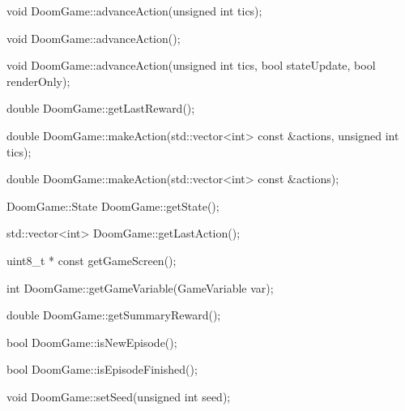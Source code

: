 \documentclass[english,bachelor,a4paper,twoside]{ppfcmthesis}
\begin{document}
\begin{clinee}
	void DoomGame::advanceAction(unsigned int tics);
\end{clinee}


\begin{clinee}
	void DoomGame::advanceAction();
\end{clinee}


\begin{clinee}
	void DoomGame::advanceAction(unsigned int tics, bool stateUpdate, bool renderOnly);
\end{clinee}


\begin{clinee}
	double DoomGame::getLastReward();
\end{clinee}


\begin{clinee}
	double DoomGame::makeAction(std::vector<int> const &actions, unsigned int tics);
\end{clinee}

   
\begin{clinee}
	double DoomGame::makeAction(std::vector<int> const &actions);
\end{clinee}


\begin{clinee}
	DoomGame::State DoomGame::getState();
\end{clinee}


\begin{clinee}
	std::vector<int> DoomGame::getLastAction();
\end{clinee}


\begin{clinee}
	uint8_t * const getGameScreen();
\end{clinee}


\begin{clinee}
	int DoomGame::getGameVariable(GameVariable var);
\end{clinee}


\begin{clinee}
	double DoomGame::getSummaryReward();
\end{clinee}


\begin{clinee}
	bool DoomGame::isNewEpisode();
\end{clinee}


\begin{clinee}
	bool DoomGame::isEpisodeFinished();
\end{clinee}


\begin{clinee}
	void DoomGame::setSeed(unsigned int seed);
\end{clinee}
\end{document}
